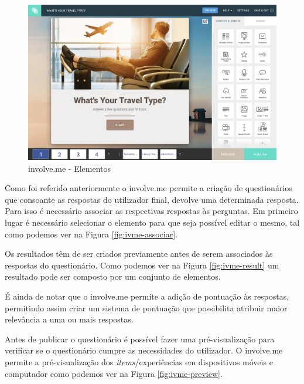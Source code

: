 \begin{figure}[ht!]
	\begin{center}
		\includegraphics[width=1\textwidth]{img/ivme/elements}
		\caption{involve.me - Elementos}
		\label{fig:ivme-elements}
	\end{center}
\end{figure}

Como foi referido anteriormente o involve.me permite a criação de questionários que consoante as respostas do utilizador final, devolve uma determinada resposta. Para isso é necessário associar as respectivas respostas às perguntas. Em primeiro lugar é necessário selecionar o elemento para que seja possível editar o mesmo, tal como podemos ver na Figura \ref{fig:ivme-associar}.

Os resultados têm de ser criados previamente antes de serem associados às respostas do questionário. Como podemos ver na Figura \ref{fig:ivme-result} um resultado pode ser composto por um conjunto de elementos. 

É ainda de notar que o involve.me permite a adição de pontuação às respostas, permitindo assim criar um sistema de pontuação que possibilita atribuir maior relevância a uma ou mais respostas.

 Antes de publicar o questionário é possível fazer uma pré-visualização para verificar se o questionário cumpre as necessidades do utilizador. O involve.me permite a pré-visualização dos \textit{items}/experiências em dispositivos móveis e computador como podemos ver na Figura \ref{fig:ivme-preview}.
 
